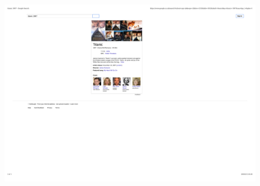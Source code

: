 \documentclass[mathserif,12pt]{beamer}
\begin{document}
\begin{frame}
\begin{columns}
 \begin{column}{0.45\textwidth}
 \vspace{-1cm}
 \begin{figure}
  \includegraphics[scale=0.45]{figures/titanic} 
 \end{figure}
 \end{column}
\end{columns}
\end{frame}
\end{document}
